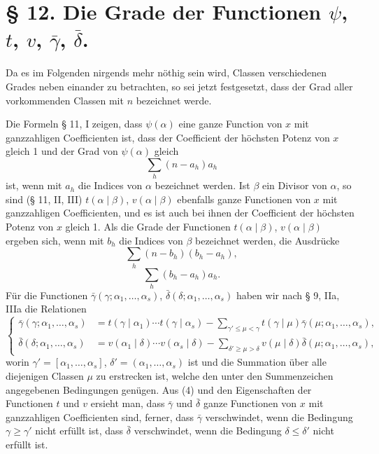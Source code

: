 \section*{§ 12. Die Grade der Functionen $\psi$, $t$, $v$, $\bar\gamma$, $\bar\delta$.}

Da es im Folgenden nirgends mehr nöthig sein wird, Classen verschiedenen Grades neben einander zu betrachten, so sei jetzt festgesetzt, dass der Grad aller vorkommenden Classen mit $n$ bezeichnet werde.

Die Formeln § 11, I zeigen, dass $\psi(\alpha)$ eine ganze Function von $x$ mit ganzzahligen Coefficienten ist, dass der Coefficient der höchsten Potenz von $x$ gleich 1 und der Grad von $\psi(\alpha)$ gleich
\begin{equation}
 \sum_h(n-a_h)a_h
\tag{1}
\end{equation}
ist, wenn mit $a_h$ die Indices von $\alpha$ bezeichnet werden. Ist $\beta$ ein Divisor von $\alpha$, so sind (§ 11, II, III) $t(\alpha\mid\beta)$, $v(\alpha\mid\beta)$ ebenfalls ganze Functionen von $x$ mit ganzzahligen Coefficienten, und es ist auch bei ihnen der Coefficient der höchsten Potenz von $x$ gleich 1. Als die Grade der Functionen $t(\alpha\mid\beta)$, $v(\alpha\mid\beta)$ ergeben sich, wenn mit $b_h$ die Indices von $\beta$ bezeichnet werden, die Ausdrücke
\begin{equation}
 \sum_h(n-b_h)(b_h-a_h),
\tag{2}
\end{equation}
\begin{equation}
 \sum_h(b_h-a_h)a_h.
\tag{3}
\end{equation}
Für die Functionen $\bar\gamma(\gamma;\alpha_1,\ldots,\alpha_s)$, $\bar\delta(\delta;\alpha_1,\ldots,\alpha_s)$ haben wir nach § 9, IIa, IIIa die Relationen
\begin{equation}
\left\{
\begin{aligned}
 \bar\gamma(\gamma;\alpha_1,\ldots,\alpha_s)
 &=t(\gamma\mid\alpha_1)\cdots t(\gamma\mid\alpha_s)
 -\sum_{\gamma'\le\mu<\gamma}t(\gamma\mid\mu)\bar\gamma(\mu;\alpha_1,\ldots,\alpha_s),\\
 \bar\delta(\delta;\alpha_1,\ldots,\alpha_s)
 &=v(\alpha_1\mid\delta)\cdots v(\alpha_s\mid\delta)
 -\sum_{\delta'\ge\mu>\delta}v(\mu\mid\delta)\bar\delta(\mu;\alpha_1,\ldots,\alpha_s),
\end{aligned}
\right.
\tag{4}
\end{equation}
worin $\gamma'=[\alpha_1,\ldots,\alpha_s]$, $\delta'=(\alpha_1,\ldots,\alpha_s)$ ist und die Summation über alle diejenigen Classen $\mu$ zu erstrecken ist, welche den unter den Summenzeichen angegebenen Bedingungen genügen. Aus (4) und den Eigenschaften der Functionen $t$ und $v$ ersieht man, dass $\bar\gamma$ und $\bar\delta$ ganze Functionen von $x$ mit ganzzahligen Coefficienten sind, ferner, dass $\bar\gamma$ verschwindet, wenn die Bedingung $\gamma\ge\gamma'$ nicht erfüllt ist, dass $\bar\delta$ verschwindet, wenn die Bedingung $\delta\le\delta'$ nicht erfüllt ist.

